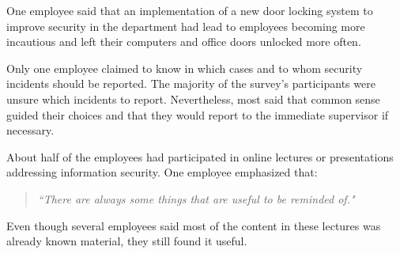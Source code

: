 One employee said that an implementation of a new door locking system to improve security in the department had lead to employees becoming more incautious and left their computers and office doors unlocked more often.

Only one employee claimed to know in which cases and to whom security incidents should be reported. The majority of the survey's participants were unsure which incidents to report. Nevertheless, most said that common sense guided their choices and that they would report to the immediate supervisor if necessary.

About half of the employees had participated in online lectures or presentations addressing information security. One employee emphasized that:

\begin{quote}
\textit{``There are always some things that are useful to be reminded of."}
\end{quote}

Even though several employees said most of the content in these lectures was already known material, they still found it useful.